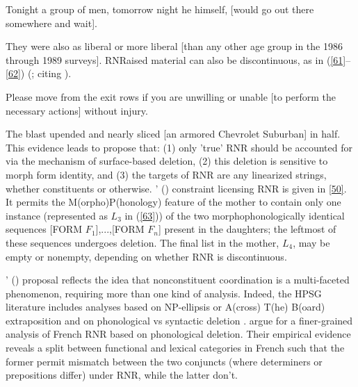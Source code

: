 \documentclass[output=paper
                ,modfonts
                ,nonflat
	        ,collection
	        ,collectionchapter
	        ,collectiontoclongg
 	        ,biblatex
                ,babelshorthands
                ,newtxmath
                ,draftmode
                ,colorlinks, citecolor=brown
]{./langsci/langscibook}
\begin{document}
{\ea Tonight a group of men, tomorrow night he himself, [would go out there somewhere and wait].\label{59}\z

\ea They were also as liberal or more liberal [than any other age group in the 1986 through 1989 surveys].\label{60}\z
RNRaised material can also be discontinuous, as in (\ref{61}--\ref{62}) (\citealt[868]{Chaves2014}; citing \citealt[238--240]{Whitman2009}).

\ea Please move from the exit rows if you are unwilling or unable [to perform the necessary actions] without injury.\label{61}\z

\ea The blast upended and nearly sliced [an armored Chevrolet Suburban] in half.\label{62}\z
This evidence leads \citet{Chaves2014} to propose that: (1) only 'true' RNR should be accounted for via the mechanism of surface-based deletion, (2) this deletion is sensitive to morph form identity, and (3) the targets of RNR are any linearized strings, whether constituents or otherwise. \citeauthor{Chaves2014}' (\citeyear[874]{Chaves2014}) constraint licensing RNR is given in \ref{50}. It permits the M(orpho)P(honology) feature of the mother to contain only one instance (represented as $L_{3}$ in (\ref{63})) of the two morphophonologically identical sequences [FORM $F_{1}$],...,[FORM $F_{n}$] present in the daughters; the leftmost of these sequences undergoes deletion. The final list in the mother, $L_{4}$, may be empty or nonempty, depending on whether RNR is discontinuous.


\z



\citeauthor{Chaves2014}' (\citeyear{Chaves2014}) proposal reflects the idea that nonconstituent coordination is a multi-faceted phenomenon, requiring more than one kind of analysis. Indeed, the HPSG literature includes analyses based on NP-ellipsis or A(cross) T(he) B(oard) extraposition \citep{Chaves2014} and on phonological vs syntactic deletion \citep{Yatabe2001, Yatabe2012, Yatabe2018}. \citet{Abeille2016} argue for a finer-grained analysis of French RNR based on phonological deletion. Their empirical evidence reveals a split between functional and lexical categories in French such that the former permit mismatch between the two conjuncts (where determiners or prepositions differ) under RNR, while the latter don't.



}
\end{document}
